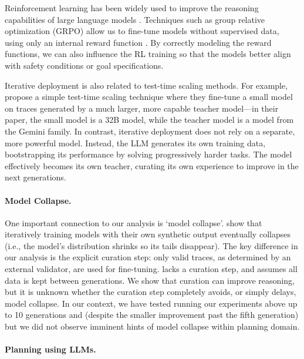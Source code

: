 \documentclass{article}
\renewcommand{\cite}[1]{\citep[][]{#1}}
\newcommand{\egcite}[1]{\citep[e.g.,][]{#1}}
\begin{document}
Reinforcement learning has been widely used to improve the reasoning
capabilities of large language models
\egcite{shao-et-al-arxiv2024,deepseek-arxiv2025}. Techniques such as group
relative optimization (GRPO) allow us to fine-tune models without supervised
data, using only an internal reward function \cite{shao-et-al-arxiv2024}. By
correctly modeling the reward functions, we can also influence the RL training
so that the models better align with safety conditions or goal specifications.

Iterative deployment is also related to test-time scaling methods. For example,
\citet{muennighoff-et-al-arxiv2025} propose a simple test-time scaling technique
where they fine-tune a small model on traces generated by a much larger, more
capable teacher model---in their paper, the small model is a 32B model, while
the teacher model is a model from the Gemini family. In contrast, iterative deployment
does not rely on a separate, more powerful model. Instead, the LLM generates its
own training data, bootstrapping its performance by solving progressively harder
tasks. The model effectively becomes its own teacher, curating its own
experience to improve in the next generations.


\paragraph{Model Collapse.}
One important connection to our analysis is `model collapse'. \citet{shumailov-et-al-nature2024} show that iteratively training
models with their own synthetic output eventually collapses (i.e., the model's
distribution shrinks so its tails disappear). The key difference in our analysis
is the explicit curation step: only valid traces, as determined by an external
validator, are used for fine-tuning.
\citet{shumailov-et-al-nature2024} lacks a curation step, and assumes all data is kept between generations.
We show that curation can improve reasoning, but it is unknown whether the curation step completely avoids, or simply delays, model collapse. In our context, we have
tested running our experiments above up to 10 generations and (despite the
smaller improvement past the fifth generation) but we did not observe imminent
hints of model collapse within planning domain.


\paragraph{Planning using LLMs.}
\end{document}
